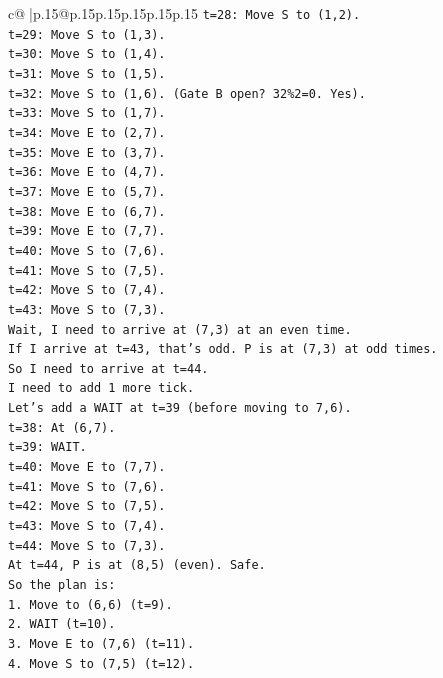 \documentclass{article}
\begin{document}
{\begin{supertabular}{c@{$\;$}|p{.15\linewidth}@{}p{.15\linewidth}p{.15\linewidth}p{.15\linewidth}p{.15\linewidth}p{.15\linewidth}}
{{{\texttt{t=28: Move S to (1,2).} \\
\texttt{t=29: Move S to (1,3).} \\
\texttt{t=30: Move S to (1,4).} \\
\texttt{t=31: Move S to (1,5).} \\
\texttt{t=32: Move S to (1,6). (Gate B open? 32\%2=0. Yes).} \\
\texttt{t=33: Move S to (1,7).} \\
\texttt{t=34: Move E to (2,7).} \\
\texttt{t=35: Move E to (3,7).} \\
\texttt{t=36: Move E to (4,7).} \\
\texttt{t=37: Move E to (5,7).} \\
\texttt{t=38: Move E to (6,7).} \\
\texttt{t=39: Move E to (7,7).} \\
\texttt{t=40: Move S to (7,6).} \\
\texttt{t=41: Move S to (7,5).} \\
\texttt{t=42: Move S to (7,4).} \\
\texttt{t=43: Move S to (7,3).} \\
\texttt{Wait, I need to arrive at (7,3) at an even time.} \\
\texttt{If I arrive at t=43, that's odd. P is at (7,3) at odd times.} \\
\texttt{So I need to arrive at t=44.} \\
\texttt{I need to add 1 more tick.} \\
\texttt{Let's add a WAIT at t=39 (before moving to 7,6).} \\
\texttt{t=38: At (6,7).} \\
\texttt{t=39: WAIT.} \\
\texttt{t=40: Move E to (7,7).} \\
\texttt{t=41: Move S to (7,6).} \\
\texttt{t=42: Move S to (7,5).} \\
\texttt{t=43: Move S to (7,4).} \\
\texttt{t=44: Move S to (7,3).} \\
\texttt{At t=44, P is at (8,5) (even). Safe.} \\
\texttt{So the plan is:} \\
\texttt{1. Move to (6,6) (t=9).} \\
\texttt{2. WAIT (t=10).} \\
\texttt{3. Move E to (7,6) (t=11).} \\
\texttt{4. Move S to (7,5) (t=12).} \\
}}}
\end{supertabular}}
\end{document}
